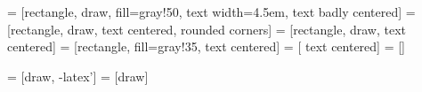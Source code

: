  = [rectangle, draw, fill=gray!50, 
    text width=4.5em, text badly centered]
 = [rectangle, draw, 
    text centered, rounded corners]
 = [rectangle, draw, 
    text centered]
 = [rectangle, fill=gray!35, 
    text centered]    
 = [ 
    text centered]
 = []

 = [draw, -latex']
 = [draw]